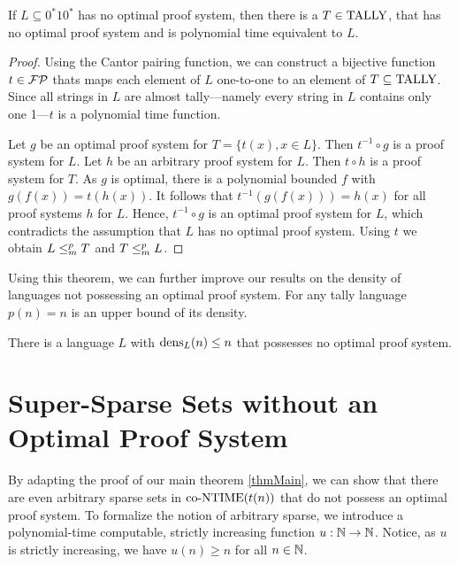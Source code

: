   \begin{theorem} \label{thmTally}
    If \(L \subseteq 0^*10^* \) has no optimal proof system, then there is a \(T \in \text{TALLY}\), that has no optimal proof system and is polynomial time equivalent to \(L\).
  \end{theorem}

  \begin{proof}
    Using the Cantor pairing function, we can construct a bijective function \(t \in \mathcal{FP}\) thats maps each element of \(L\) one-to-one to an element of \(T \subseteq \text{TALLY}\). Since all strings in \(L\) are almost tally---namely every string in \(L\) contains only one 1---\(t\) is a polynomial time function. 
    
    Let \(g\) be an optimal proof system for \(T = \{ t(x), x \in L \}\). Then \(t^{-1} \circ g\) is a proof system for \(L\). Let \(h\) be an arbitrary proof system for \(L\). Then \(t \circ h\) is a proof system for \(T\). As \(g\) is optimal, there is a polynomial bounded \(f\) with \(g(f(x)) = t(h(x))\). It follows that \(t^{-1}(g(f(x))) = h(x)\) for all proof systems \(h\) for \(L\). Hence, \(t^{-1} \circ g\) is an optimal proof system for \(L\), which contradicts the assumption that \(L\) has no optimal proof system. Using \(t\) we obtain \(L \leq_{m}^{p} T\) and \(T \leq_{m}^{p} L\).
  \end{proof}
  
  Using this theorem, we can further improve our results on the density of languages not possessing an optimal proof system. For any tally language \(p(n) = n\) is an upper bound of its density.

  \begin{corollary}
    There is a language \(L\) with \(\operatorname{dens}_L(n) \leq n\) that possesses no optimal proof system.
  \end{corollary}

  \section{Super-Sparse Sets without an Optimal Proof System}

  By adapting the proof of our main theorem \ref{thmMain}, we can show that there are even arbitrary sparse sets in \(\text{co-NTIME}(t(n))\) that do not possess an optimal proof system. To formalize the notion of arbitrary sparse, we introduce a polynomial-time computable, strictly increasing function \(u : \mathbb{N} \to \mathbb{N}\). Notice, as \(u\) is strictly increasing, we have \(u(n) \geq n\) for all \(n \in \mathbb{N}\).

